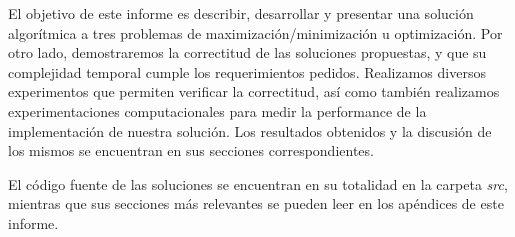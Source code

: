 El objetivo de este informe es describir, desarrollar y presentar una solución algorítmica a tres problemas de maximización/minimización u optimización. Por otro lado, demostraremos la correctitud de las soluciones propuestas, y que su complejidad temporal cumple los requerimientos pedidos. Realizamos diversos experimentos que permiten verificar la correctitud, así como también realizamos experimentaciones computacionales para medir la performance de la implementación de nuestra solución. Los resultados obtenidos y la discusión de los mismos se encuentran en sus secciones correspondientes.

El código fuente de las soluciones se encuentran en su totalidad en la carpeta \emph{src}, mientras que sus secciones más relevantes se pueden leer en los apéndices de este informe.